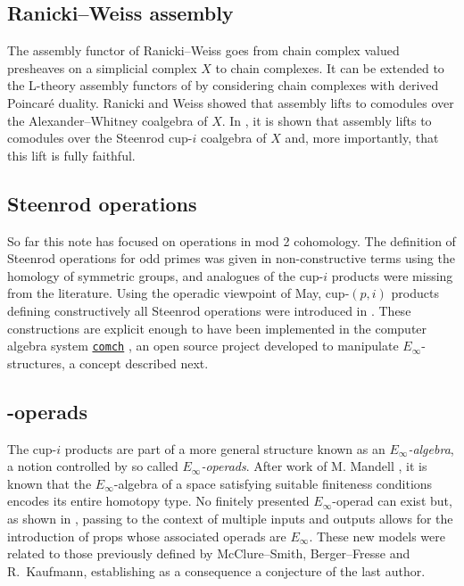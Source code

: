 \subsection{Ranicki--Weiss assembly}

The assembly functor of Ranicki--Weiss \cite{ranicki1990assembly} goes from chain complex valued presheaves on a simplicial complex $X$ to chain complexes.
It can be extended to the L-theory assembly functors of \cite{ranicki1992topological} by considering chain complexes with derived Poincar\'e duality.
Ranicki and Weiss showed that assembly lifts to comodules over the Alexander--Whitney coalgebra of $X$.
In \cite{medina2022assembly}, it is shown that assembly lifts to comodules over the Steenrod cup-$i$ coalgebra of $X$ and, more importantly, that this lift is fully faithful.

\subsection{Steenrod operations} \label{ss:may steenrod}

So far this note has focused on operations in mod 2 cohomology.
The definition of Steenrod operations for odd primes was given in non-constructive terms using the homology of symmetric groups, and analogues of the cup-$i$ products were missing from the literature.
Using the operadic viewpoint of May, cup-$(p,i)$ products defining constructively all Steenrod operations
were introduced in \cite{medina2021may_st}.
These constructions are explicit enough to have been implemented in the computer algebra system \href{https://comch.readthedocs.io/en/latest/}{\texttt{comch}} \cite{medina2021comch}, an open source project developed to manipulate $E_\infty$-structures, a concept described next.

\subsection{\pdfEinfty-operads}

The cup-$i$ products are part of a more general structure known as an \textit{$E_\infty$-algebra}, a notion controlled by so called \textit{$E_\infty$-operads}.
After work of M. Mandell \cite{mandell2006cochains}, it is known that the $E_\infty$-algebra of a space satisfying suitable finiteness conditions encodes its entire homotopy type.
No finitely presented $E_\infty$-operad can exist but, as shown in \cite{medina2020prop1,medina2021prop2}, passing to the context of multiple inputs and outputs allows for the introduction of props whose associated operads are $E_\infty$.
These new models were related to those previously defined by McClure--Smith, Berger--Fresse and R.~Kaufmann, establishing as a consequence a conjecture of the last author.

